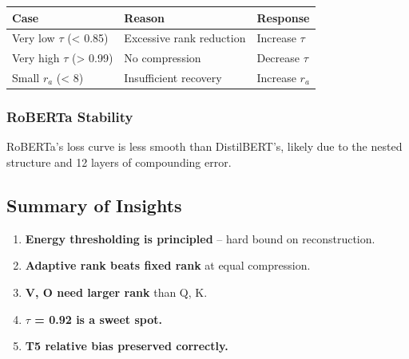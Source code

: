 \begin{table}[H]
\centering
\small
\begin{tabular}{lll}
\toprule
\textbf{Case} & \textbf{Reason} & \textbf{Response} \\
\midrule
Very low $\tau$ (< 0.85) & Excessive rank reduction & Increase $\tau$ \\
Very high $\tau$ (> 0.99) & No compression & Decrease $\tau$ \\
Small $r_a$ (< 8) & Insufficient recovery & Increase $r_a$ \\
\bottomrule
\end{tabular}
\end{table}

\subsubsection{RoBERTa Stability}

RoBERTa's loss curve is less smooth than DistilBERT's, likely due to the 
nested structure and 12 layers of compounding error.

\subsection{Summary of Insights}

\begin{enumerate}
\item \textbf{Energy thresholding is principled} -- hard bound on reconstruction.
\item \textbf{Adaptive rank beats fixed rank} at equal compression.
\item \textbf{V, O need larger rank} than Q, K.
\item \textbf{$\tau$ = 0.92 is a sweet spot.}
\item \textbf{T5 relative bias preserved correctly.}

\end{enumerate}
